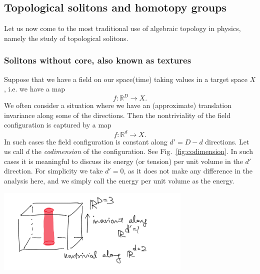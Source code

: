 \documentclass[12pt]{article}
\numberwithin{equation}{section}
\theoremstyle{remark}
\renewenvironment{figure}[1][]{
  \begin{originalfigure}[#1]
    \begin{mdframed}[linecolor=black!0,backgroundcolor=black!1]
}{
    \end{mdframed}
  \end{originalfigure}
}
\def\bR{\mathbb{R}}
\begin{document}
\subsection{Topological solitons and homotopy groups}




Let us now come to the most traditional use of algebraic topology in physics, 
namely the study of topological solitons. 

\subsubsection{Solitons without core, also known as textures}
Suppose that we have a field on our space(time) taking values in a target space $X$,
i.e. we have a map \begin{equation}
f:\bR^D \to X.
\end{equation}
We often consider a situation where we have an (approximate) translation invariance along 
some of the directions.
Then the nontriviality of the field configuration is captured by a map 
\begin{equation}
f:\bR^d \to X.
\end{equation}
In such cases the field configuration is constant along $d'=D-d$ directions.
Let us call $d$ the \emph{codimension} of the configuration.
See Fig.~\ref{fig:codimension}.
In such cases it is meaningful to discuss its energy (or tension) per unit volume in the $d'$ direction.
For simplicity we take $d'=0$, as it does not make any difference in the analysis here,
and we simply call the energy per unit volume as the energy.

\begin{figure}[h]
\centering
  \includegraphics[width=0.7\textwidth]{codimension.png}
  \caption{A codimension-2 object in $\bR^3$ is string-like. }
  \label{fig:codimension}
\end{figure}
\end{document}
